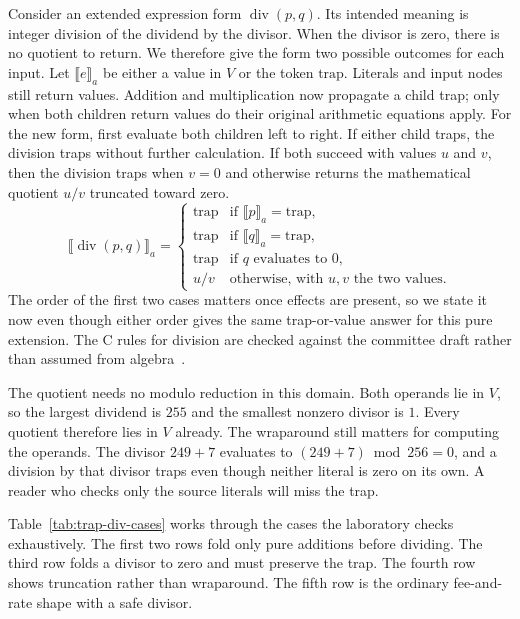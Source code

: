 Consider an extended expression form $\operatorname{div}(p,q)$.
Its intended meaning is integer division of the dividend by the divisor.
When the divisor is zero, there is no quotient to return.
We therefore give the form two possible outcomes for each input.
Let $\llbracket e\rrbracket_a$ be either a value in $V$ or the token $\text{trap}$.
Literals and input nodes still return values.
Addition and multiplication now propagate a child trap; only when both children return values do their original arithmetic equations apply.
For the new form, first evaluate both children left to right.
If either child traps, the division traps without further calculation.
If both succeed with values $u$ and $v$, then the division traps when $v=0$ and otherwise returns the mathematical quotient $u/v$ truncated toward zero.
\begin{equation}
  \llbracket\operatorname{div}(p,q)\rrbracket_a=
  \begin{cases}
    \text{trap} & \text{if $\llbracket p\rrbracket_a=\text{trap}$},\\
    \text{trap} & \text{if $\llbracket q\rrbracket_a=\text{trap}$},\\
    \text{trap} & \text{if $q$ evaluates to $0$},\\
    u/v & \text{otherwise, with $u,v$ the two values}.
  \end{cases}
  \label{eq:trap-div-semantics}
\end{equation}
The order of the first two cases matters once effects are present, so we state it now even though either order gives the same trap-or-value answer for this pure extension.
The C rules for division are checked against the committee draft rather than assumed from algebra~\cite{wg14-2011-c11}.

The quotient needs no modulo reduction in this domain.
Both operands lie in $V$, so the largest dividend is $255$ and the smallest nonzero divisor is $1$.
Every quotient therefore lies in $V$ already.
The wraparound still matters for computing the operands.
The divisor $249+7$ evaluates to $(249+7)\bmod256=0$, and a division by that divisor traps even though neither literal is zero on its own.
A reader who checks only the source literals will miss the trap.

Table~\ref{tab:trap-div-cases} works through the cases the laboratory checks exhaustively.
The first two rows fold only pure additions before dividing.
The third row folds a divisor to zero and must preserve the trap.
The fourth row shows truncation rather than wraparound.
The fifth row is the ordinary fee-and-rate shape with a safe divisor.


